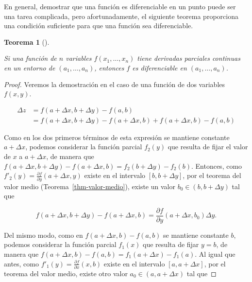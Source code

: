 \documentclass[
  a4paper,
]{scrreport}
\theoremstyle{plain}
\theoremstyle{plain}
\newtheorem{theorem}{Teorema}[chapter]
\theoremstyle{definition}
\theoremstyle{definition}
\theoremstyle{plain}
\theoremstyle{definition}
\theoremstyle{remark}
\begin{document}
En general, demostrar que una función es diferenciable en un punto puede
ser una tarea complicada, pero afortunadamente, el siguiente teorema
proporciona una condición suficiente para que una función sea
diferenciable.

\begin{theorem}[]\protect\hypertarget{thm-diferenciabilidad-funciones-varias-variables}{}\label{thm-diferenciabilidad-funciones-varias-variables}

Si una función de \(n\) variables \(f(x_1,\ldots,x_n)\) tiene derivadas
parciales continuas en un entorno de \((a_1,\ldots,a_n)\), entonces
\(f\) es diferenciable en \((a_1,\ldots,a_n)\).

\end{theorem}

\begin{tcolorbox}[enhanced jigsaw, rightrule=.15mm, toptitle=1mm, colbacktitle=quarto-callout-note-color!10!white, bottomrule=.15mm, opacityback=0, arc=.35mm, breakable, toprule=.15mm, left=2mm, coltitle=black, colback=white, opacitybacktitle=0.6, titlerule=0mm, colframe=quarto-callout-note-color-frame, bottomtitle=1mm, title=\textcolor{quarto-callout-note-color}{\faInfo}\hspace{0.5em}{Demostración}, leftrule=.75mm]

\begin{proof}

Veremos la demostración en el caso de una función de dos variables
\(f(x,y)\).

\begin{align*}
\Delta z 
&= f(a+\Delta x, b+\Delta y) - f(a,b) \\
&= f(a+\Delta x, b+\Delta y) - f(a+\Delta x, b) + f(a+\Delta x, b) - f(a,b) 
\end{align*}

Como en los dos primeros términos de esta expresión se mantiene
constante \(a+\Delta x\), podemos considerar la función parcial
\(f_2(y)\) que resulta de fijar el valor de \(x\) a \(a+\Delta x\), de
manera que
\(f(a+\Delta x, b+\Delta y) - f(a+\Delta x, b) = f_2(b+\Delta y)-f_2(b)\).
Entonces, como \(f'_2(y)=\frac{\partial f}{\partial y}(a+\Delta x, y)\)
existe en el intervalo \([b, b+\Delta y]\), por el teorema del valor
medio (Teorema~\ref{thm-valor-medio}), existe un valor
\(b_0\in(b, b+\Delta y)\) tal que

\[
f(a+\Delta x, b+\Delta y) - f(a+\Delta x, b) = \frac{\partial f}{\partial y}(a+\Delta x, b_0) \Delta y.
\]

Del mismo modo, como en \(f(a+\Delta x, b) - f(a,b)\) se mantiene
constante \(b\), podemos considerar la función parcial \(f_1(x)\) que
resulta de fijar \(y=b\), de manera que
\(f(a+\Delta x, b) - f(a,b)=f_1(a+\Delta x)-f_1(a)\). Al igual que
antes, como \(f'_1(y)=\frac{\partial f}{\partial x}(x, b)\) existe en el
intervalo \([a, a+\Delta x]\), por el teorema del valor medio, existe
otro valor \(a_0\in(a, a+\Delta x)\) tal que


\end{proof}
\end{tcolorbox}
\end{document}

